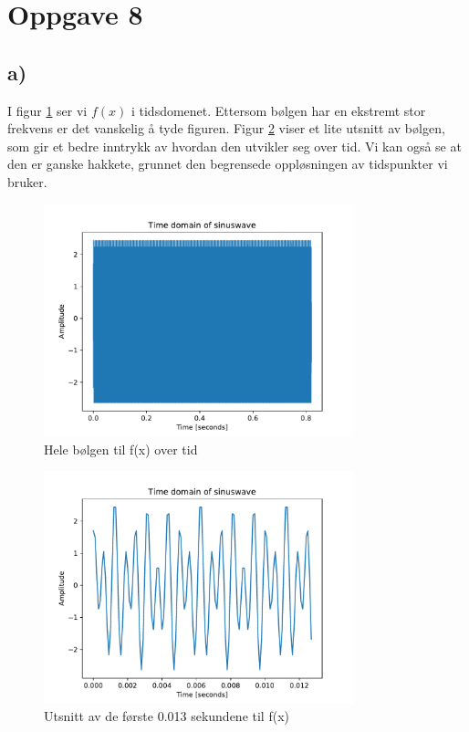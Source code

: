 \documentclass[11pt,norsk]{article}
\begin{document}
\section*{Oppgave 8}
\subsection*{a)}
I figur \ref{fig:sinus_wave1} ser vi $f(x)$ i tidsdomenet. Ettersom bølgen har en ekstremt stor frekvens er det vanskelig å tyde figuren. Figur \ref{fig:sinus_wave2} viser et lite utsnitt av bølgen, som gir et bedre inntrykk av hvordan den utvikler seg over tid. Vi kan også se at den er ganske hakkete, grunnet den begrensede oppløsningen av tidspunkter vi bruker.
\begin{figure}[H]
\centering
\includegraphics[width=0.8\textwidth]{fig/sinus_wave1.pdf}
\caption{Hele bølgen til f(x) over tid}
\label{fig:sinus_wave1}
\end{figure}

\begin{figure}[H]
\centering
\includegraphics[width=0.8\textwidth]{fig/sinus_wave2.pdf}
\caption{Utsnitt av de første 0.013 sekundene til f(x)}
\label{fig:sinus_wave2}
\end{figure}
\end{document}

